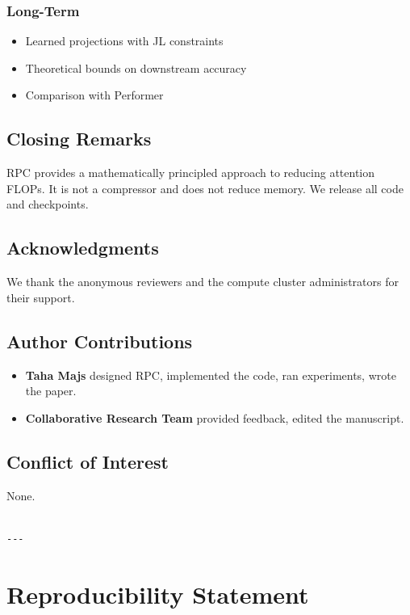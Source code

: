 \subsubsection{Long-Term}
\begin{itemize}
\item Learned projections with JL constraints
\item Theoretical bounds on downstream accuracy
\item Comparison with Performer

\end{itemize}
\subsection{Closing Remarks}

RPC provides a mathematically principled approach to reducing attention 
FLOPs. It is not a compressor and does not reduce memory. We release all 
code and checkpoints.

\subsection{Acknowledgments}

We thank the anonymous reviewers and the compute cluster administrators for their support.

\subsection{Author Contributions}

\begin{itemize}
\item \textbf{Taha Majs} designed RPC, implemented the code, ran experiments,
  wrote the paper.
\item \textbf{Collaborative Research Team} provided feedback, edited the manuscript.

\end{itemize}
\subsection{Conflict of Interest}

None.
\begin{lstlisting}

---
\end{lstlisting}


\section{Reproducibility Statement}

